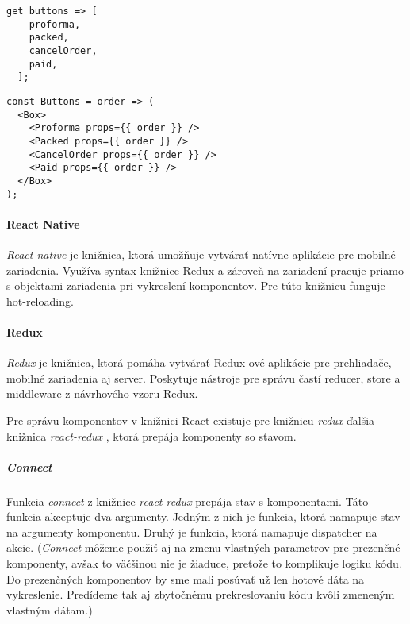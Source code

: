 \begin{lstlisting}[caption=Pole komponentov v Dart-e]
  get buttons => [
    proforma,
    packed,
    cancelOrder,
    paid,
  ];
\end{lstlisting}

\begin{lstlisting}[caption=Pole komponentov v JavaScript-e s použitím knižnice React]
const Buttons = order => (
  <Box>
    <Proforma props={{ order }} />
    <Packed props={{ order }} />
    <CancelOrder props={{ order }} />
    <Paid props={{ order }} />
  </Box>
);
\end{lstlisting}

\paragraph{React Native}
\emph{React-native} \cite{ReactNative} je knižnica, ktorá umožňuje vytvárať natívne aplikácie pre mobilné zariadenia. Využíva syntax knižnice Redux a zároveň na zariadení pracuje priamo s objektami zariadenia pri vykreslení komponentov. Pre túto knižnicu funguje hot-reloading.

\paragraph{Redux}
\emph{Redux} \cite{redux-lib} je knižnica, ktorá pomáha vytvárať Redux-ové aplikácie pre prehliadače, mobilné zariadenia aj server. Poskytuje nástroje pre správu častí reducer, store a middleware z návrhového vzoru Redux. 

Pre správu komponentov v knižnici React existuje pre knižnicu \emph{redux} ďalšia knižnica \emph{react-redux} \cite{react-redux}, ktorá prepája komponenty so stavom.

\subparagraph{Connect}
\label{func:connect}
Funkcia \emph{connect} z knižnice \emph{react-redux} \cite{react-redux} prepája stav s komponentami. Táto funkcia akceptuje dva argumenty. Jedným z nich je funkcia, ktorá namapuje stav na argumenty komponentu. Druhý je funkcia, ktorá namapuje dispatcher na akcie. %
(\emph{Connect} môžeme použiť aj na zmenu vlastných parametrov pre prezenčné komponenty, avšak to väčšinou nie je žiaduce, pretože to komplikuje logiku kódu. Do prezenčných komponentov by sme mali posúvať už len hotové dáta na vykreslenie. Predídeme tak aj zbytočnému prekreslovaniu kódu kvôli zmeneným vlastným dátam.)



